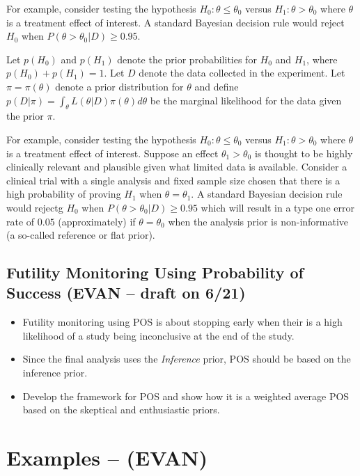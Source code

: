 \documentclass[12pt]{article}
\begin{document}
For example, consider testing the hypothesis $H_0:\theta\leq\theta_0$ versus $H_1:\theta>\theta_0$ where $\theta$ is a treatment effect of interest. A standard Bayesian decision rule would reject $H_0$ when $P(\theta>\theta_0|D)\geq 0.95$.

Let $p(H_0)$ and $p(H_1)$ denote the prior probabilities for $H_0$ and $H_1$, where $p(H_0)+p(H_1)=1$. Let $D$ denote the data collected in the experiment. Let $\pi=\pi(\theta)$ denote a prior distribution for $\theta$ and define $p(D|\pi)=\int_\theta L(\theta|D)\pi(\theta)d\theta$ be the marginal likelihood for the data given the prior $\pi$.

For example, consider testing the hypothesis $H_0:\theta\leq\theta_0$ versus $H_1:\theta>\theta_0$ where $\theta$ is a treatment effect of interest. Suppose an effect $\theta_1>\theta_0$ is thought to be highly clinically relevant and plausible given what limited data is available. Consider a clinical trial with a single analysis and fixed sample size chosen that there is a high probability of proving $H_1$ when $\theta=\theta_1$. A standard Bayesian decision rule would rejectg $H_0$ when $P(\theta>\theta_0|D)\geq 0.95$ which will result in a type one error rate of $0.05$ (approximately) if $\theta=\theta_0$ when the analysis prior is non-informative (a so-called reference or flat prior).

\subsection{Futility Monitoring Using Probability of Success (EVAN -- draft on 6/21)}

\begin{itemize}
 \item Futility monitoring using POS is about stopping early when their is a high likelihood
       of a study being inconclusive at the end of the study.
 \item Since the final analysis uses the \textit{Inference} prior, POS should be based on the
       inference prior.
 \item Develop the framework for POS and show how it is a weighted average POS based on the skeptical
       and enthusiastic priors.
\end{itemize}



\section{Examples -- (EVAN)}
\end{document}
